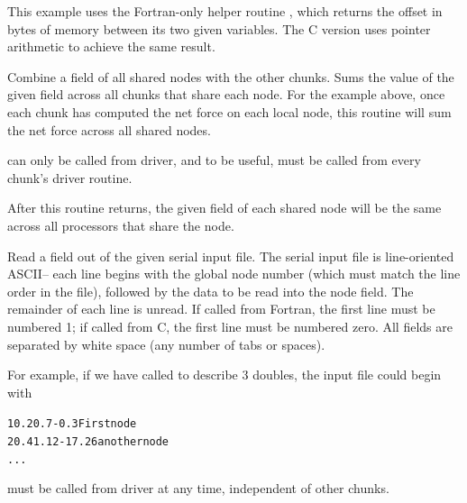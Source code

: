 \documentclass[10pt]{article}
\begin{document}
     This example uses the Fortran-only helper routine , which
     returns the offset in bytes of memory between its two given
     variables.  The C version uses pointer arithmetic to achieve the
     same result.


     Combine a field of all shared nodes with the other chunks.  Sums
     the value of the given field across all chunks that share each
     node.  For the example above, once each chunk has computed the net
     force on each local node, this routine will sum the net force
     across all shared nodes.

      can only be called from driver, and to be useful,
     must be called from every chunk's driver routine.

     After this routine returns, the given field of each shared node
     will be the same across all processors that share the node.


     Read a field out of the given serial input file.  The serial input
     file is line-oriented ASCII-- each line begins with the global
     node number (which must match the line order in the file),
     followed by the data to be read into the node field.  The
     remainder of each line is unread.  If called from Fortran, the
     first line must be numbered 1; if called from C, the first line
     must be numbered zero.  All fields are separated by white space
     (any number of tabs or spaces).

     For example, if we have called  to describe 3 doubles,
     the input file could begin with

\begin{alltt}
          1    0.2    0.7    -0.3      First node
          2    0.4    1.12   -17.26    another node
          ...
\end{alltt}

      must be called from driver at any time, independent
     of other chunks.
\end{document}
